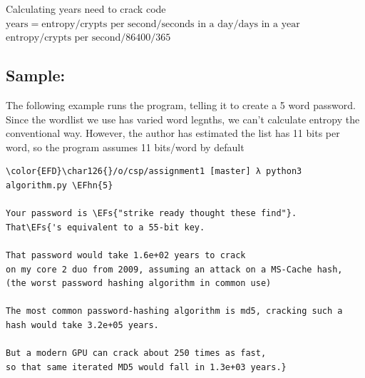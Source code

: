 \documentclass{scrartcl}
\newcommand{\EFs}[1]{\textcolor{EFs}{#1}} %
\newcommand{\EFhn}[1]{\textcolor{EFhn}{\textbf{#1}}} %
\begin{document}
Calculating years need to crack code
\(\text{years}=\text{entropy}/\text{crypts per second}/\text{seconds in a day}/\text{days in a year}\)
\(\text{entropy}/\text{crypts per second}/86400/365\)

\subsection{Sample:}
\label{sec:orgda8fe62}
The following example runs the program, telling it to create a 5 word password.
Since the wordlist we use has varied word legnths, we can't calculate entropy
the conventional way. However, the author has estimated the list has 11 bits per
word, so the program assumes 11 bits/word by default
\begin{Code}
\begin{Verbatim}[]
\color{EFD}\char126{}/o/csp/assignment1 [master] λ python3 algorithm.py \EFhn{5}

Your password is \EFs{"strike ready thought these find"}.
That\EFs{'s equivalent to a 55-bit key.

That password would take 1.6e+02 years to crack
on my core 2 duo from 2009, assuming an attack on a MS-Cache hash,
(the worst password hashing algorithm in common use)

The most common password-hashing algorithm is md5, cracking such a hash would take 3.2e+05 years.

But a modern GPU can crack about 250 times as fast,
so that same iterated MD5 would fall in 1.3e+03 years.}
\end{Verbatim}
\end{Code}
\end{document}
